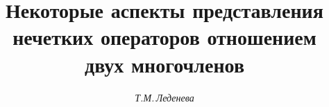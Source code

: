 









\newcommand{\arctg}{\operatorname{arctg}}


\newcommand{\vraisup}{\operatorname{vrai~sup}}


\newcommand{\tts}[1]{}


\renewcommand{\baselinestretch}{1.1}










\setcounter{page}{33}












\author{\it  Т.М.\,Леденева}


\title{Некоторые аспекты представления нечетких операторов отношением двух многочленов}







\date{}







\pagestyle{plain} %













